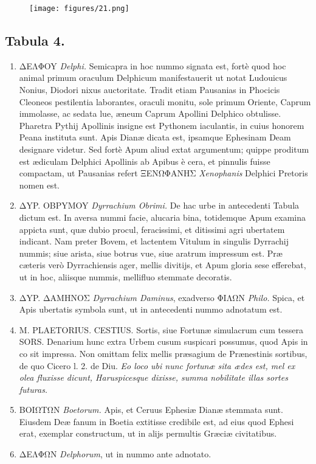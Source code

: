 \documentclass[a4paper, 11pt, oneside, polutonikogreek, latin]{article}
\begin{document}
\clearpage
\vspace*{\fill}
\begin{figure}[H]
\centering
\texttt{[image: figures/21.png]}
\end{figure}
\vspace*{\fill}
\clearpage
\subsection*{Tabula 4.}
\begin{enumerate}
    \item ΔEΛΦOY \emph{Delphi.} Semicapra in hoc nummo signata est, fortè quod hoc animal primum oraculum Delphicum manifestauerit ut notat Ludouicus Nonius, Diodori nixus auctoritate. Tradit etiam Pausanias in Phocicis Cleoneos pestilentia laborantes, oraculi monitu, sole primum Oriente, Caprum immolasse, ac sedata lue, æneum Caprum Apollini Delphico obtulisse. Pharetra Pythij Apollinis insigne est Pythonem iaculantis, in cuius honorem Peana instituta sunt. Apis Dianæ dicata est, ipsamque Ephesinam Deam designare videtur. Sed fortè Apum aliud extat argumentum; quippe proditum est ædiculam Delphici Apollinis ab Apibus è cera, et pinnulis fuisse compactam, ut Pausanias refert ΞENΩΦANHΣ \emph{Xenophanis} Delphici Pretoris nomen est.

    \item ΔYP. OBPYMOY \emph{Dyrrachium Obrimi.} De hac urbe in antecedenti Tabula dictum est. In aversa nummi facie, alucaria bina, totidemque Apum examina appicta sunt, quæ dubio procul, feracissimi, et ditissimi agri ubertatem indicant. Nam preter Bovem, et lactentem Vitulum in singulis Dyrrachij nummis; siue arista, siue botrus vue, siue aratrum impressum est. Præ cæteris verò Dyrrachiensis ager, mellis divitijs, et Apum gloria sese efferebat, ut in hoc, aliisque nummis, mellifluo stemmate decoratis.

    \item ΔYP. ΔAMHNOΣ \emph{Dyrrachium Daminus}, exadverso ΦIΛΩN \emph{Philo.} Spica, et Apis ubertatis symbola sunt, ut in antecedenti nummo adnotatum est.

    \item M. PLAETORIUS. CESTIUS. Sortis, siue Fortunæ simulacrum cum tessera SORS. Denarium hunc extra Urbem cusum suspicari possumus, quod Apis in co sit impressa. Non omittam felix mellis præsagium de Prænestinis sortibus, de quo Cicero l. 2. de Diu. \emph{Eo loco ubi nunc fortunæ sita ædes est, mel ex olea fluxisse dicunt, Haruspicesque dixisse, summa nobilitate illas sortes futuras.}

    \item BOIΩTΩN \emph{Boetorum.} Apis, et Ceruus Ephesiæ Dianæ stemmata sunt. Eiusdem Deæ fanum in Boetia extitisse credibile est, ad eius quod Ephesi erat, exemplar constructum, ut in alijs permultis Græciæ civitatibus.

    \item ΔEΛΦΩN \emph{Delphorum}, ut in nummo ante adnotato.
\end{enumerate}
\end{document}
